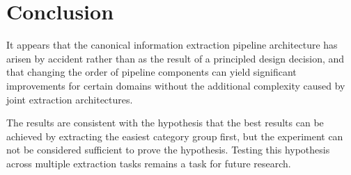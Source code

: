 \section{Conclusion}

It appears that the canonical information extraction pipeline architecture has arisen by accident rather than as the result of a principled design decision, and that changing the order of pipeline components can yield significant improvements for certain domains without the additional complexity caused by joint extraction architectures.

The results are consistent with the hypothesis that the best results can be achieved by extracting the easiest category group first, but the experiment can not be considered sufficient to prove the hypothesis. Testing this hypothesis across multiple extraction tasks remains a task for future research.